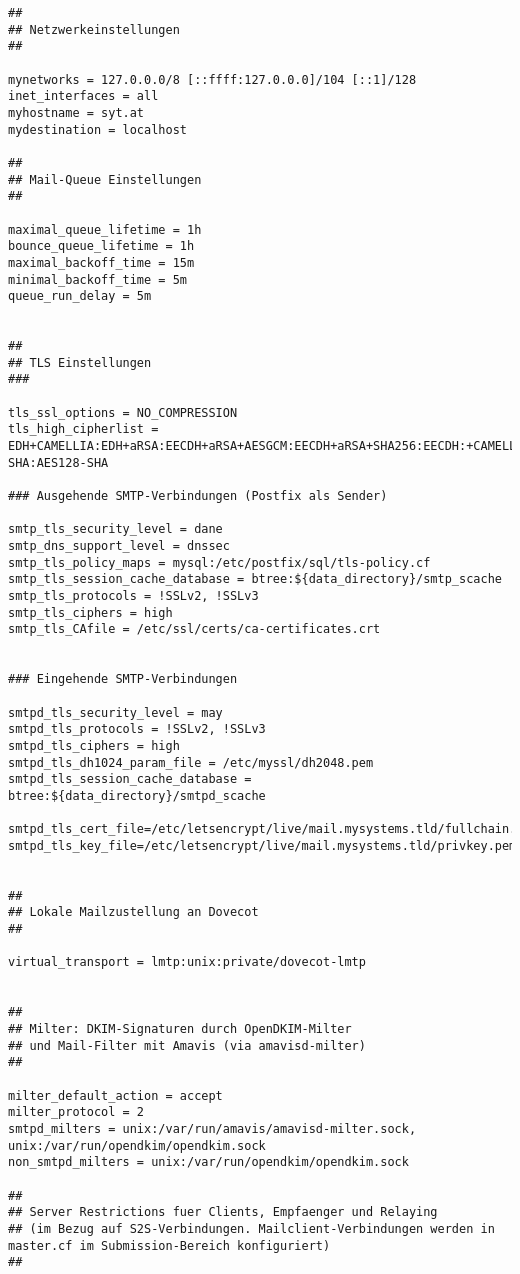 \begin{lstlisting}[caption=main.cf - Postfix]
##
## Netzwerkeinstellungen
##

mynetworks = 127.0.0.0/8 [::ffff:127.0.0.0]/104 [::1]/128
inet_interfaces = all
myhostname = syt.at
mydestination = localhost

##
## Mail-Queue Einstellungen
##

maximal_queue_lifetime = 1h
bounce_queue_lifetime = 1h
maximal_backoff_time = 15m
minimal_backoff_time = 5m
queue_run_delay = 5m


##
## TLS Einstellungen
###

tls_ssl_options = NO_COMPRESSION
tls_high_cipherlist = EDH+CAMELLIA:EDH+aRSA:EECDH+aRSA+AESGCM:EECDH+aRSA+SHA256:EECDH:+CAMELLIA128:+AES128:+SSLv3:!aNULL:!eNULL:!LOW:!3DES:!MD5:!EXP:!PSK:!DSS:!RC4:!SEED:!IDEA:!ECDSA:kEDH:CAMELLIA128-SHA:AES128-SHA

### Ausgehende SMTP-Verbindungen (Postfix als Sender)

smtp_tls_security_level = dane
smtp_dns_support_level = dnssec
smtp_tls_policy_maps = mysql:/etc/postfix/sql/tls-policy.cf
smtp_tls_session_cache_database = btree:${data_directory}/smtp_scache
smtp_tls_protocols = !SSLv2, !SSLv3
smtp_tls_ciphers = high
smtp_tls_CAfile = /etc/ssl/certs/ca-certificates.crt


### Eingehende SMTP-Verbindungen

smtpd_tls_security_level = may
smtpd_tls_protocols = !SSLv2, !SSLv3
smtpd_tls_ciphers = high
smtpd_tls_dh1024_param_file = /etc/myssl/dh2048.pem
smtpd_tls_session_cache_database = btree:${data_directory}/smtpd_scache

smtpd_tls_cert_file=/etc/letsencrypt/live/mail.mysystems.tld/fullchain.pem
smtpd_tls_key_file=/etc/letsencrypt/live/mail.mysystems.tld/privkey.pem


##
## Lokale Mailzustellung an Dovecot
##

virtual_transport = lmtp:unix:private/dovecot-lmtp


##
## Milter: DKIM-Signaturen durch OpenDKIM-Milter
## und Mail-Filter mit Amavis (via amavisd-milter)
##

milter_default_action = accept
milter_protocol = 2
smtpd_milters = unix:/var/run/amavis/amavisd-milter.sock,
unix:/var/run/opendkim/opendkim.sock
non_smtpd_milters = unix:/var/run/opendkim/opendkim.sock

##
## Server Restrictions fuer Clients, Empfaenger und Relaying
## (im Bezug auf S2S-Verbindungen. Mailclient-Verbindungen werden in master.cf im Submission-Bereich konfiguriert)
##


\end{lstlisting}
